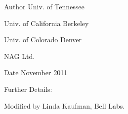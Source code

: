 \begin{DoxyAuthor}{Author}
Univ. of Tennessee 

Univ. of California Berkeley 

Univ. of Colorado Denver 

N\+A\+G Ltd. 
\end{DoxyAuthor}
\begin{DoxyDate}{Date}
November 2011 
\end{DoxyDate}
\begin{DoxyParagraph}{Further Details\+: }
\begin{DoxyVerb}  Modified by Linda Kaufman, Bell Labs.\end{DoxyVerb}
 
\end{DoxyParagraph}
